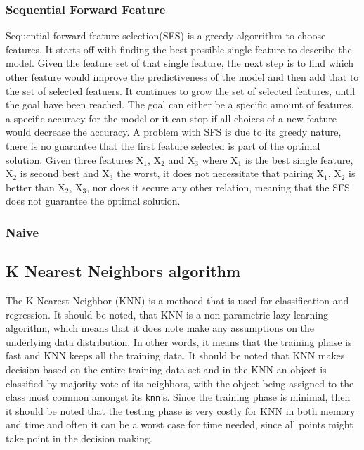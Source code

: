 \subsubsection{Sequential Forward Feature}
Sequential forward feature selection(SFS) is a greedy algorrithm to choose features.
It starts off with finding the best possible single feature to describe the model. Given the feature set of that single feature, the next step is to find which other feature would improve the predictiveness of the model and then add that to the set of selected featuers. It continues to grow the set of selected features, until the goal have been reached. The goal can either be a specific amount of features, a specific accuracy for the model or it can stop if all choices of a new feature would decrease the accuracy.
A problem with SFS is due to its greedy nature, there is no guarantee that the first feature selected is part of the optimal solution. Given three features X$_1$, X$_2$ and X$_3$ where X$_1$ is the best single feature, X$_2$ is second best and X$_3$ the worst, it does not necessitate that pairing {X$_1$, X$_2$ } is better than {X$_2$, X$_3$}, nor does it secure any other relation, meaning that the SFS does not guarantee the optimal solution.

\subsubsection{Naive}

\subsection{K Nearest Neighbors algorithm}

The K Nearest Neighbor (KNN) is a methoed that is used for classification and regression. It should be noted, that KNN is a non parametric lazy learning algorithm, which means that it does note make any assumptions on the underlying data distribution. In other words, it means that the training phase is fast and KNN keeps all the training data. It should be noted that KNN makes decision based on the entire training data set and in the KNN an object is classified by majority vote of its neighbors, with the object being assigned to the class most common amongst its \texttt{knn}'s.
Since the training phase is minimal, then it should be noted that the testing phase is very costly for KNN in both memory and time and often it can be a worst case for time needed, since all points might take point in the decision making.

